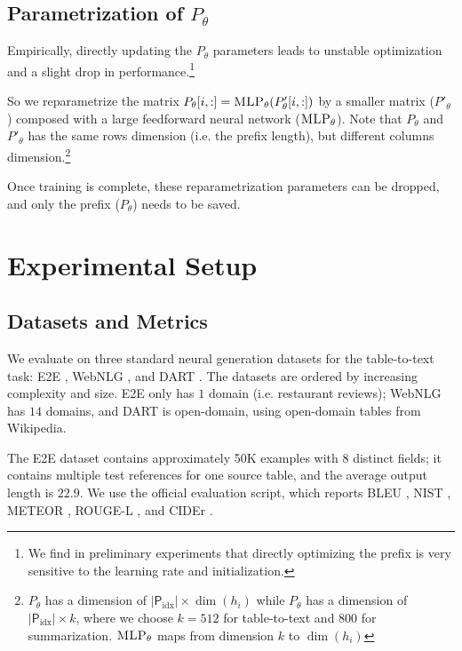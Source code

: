 \subsection{Parametrization of $P_\theta$ }
\label{ssec:parametrization}
Empirically, directly updating the $P_\theta$ parameters leads to unstable optimization and a slight drop in performance.\footnote{We find in preliminary experiments that directly optimizing the prefix is very sensitive to the learning rate and initialization.}

So we reparametrize the matrix $P_\theta [i,:]= \textsc{MLP}_\theta (P'_\theta[i,:])$ by a smaller matrix ($P'_\theta$) composed with a large feedforward neural network ($\textsc{MLP}_\theta$). 
Note that  $P_\theta$ and $P'_\theta$ has the same rows dimension (i.e. the prefix length), but different columns dimension.\footnote{$P_\theta$  has a dimension of $|\textsf{P$_{\text{idx}}$}| \times \dim(h_i)$ while $P_\theta$ has a dimension  of  $|\textsf{P$_{\text{idx}}$}| \times k$, where we choose $k=512$ for table-to-text and $800$ for summarization. $\textsc{MLP}_\theta$ maps from dimension $k$ to $\dim(h_i)$} 

Once training is complete, these reparametrization parameters can be dropped, and only the prefix ($P_\theta$) needs to be saved.  

\section{Experimental Setup}

\subsection{Datasets and Metrics}
\label{ssec:dataset}
We evaluate on three standard neural generation datasets for the table-to-text task: E2E \cite{e2edata}, WebNLG \cite{webnlg-2017}, and DART \cite{radev2020dart}. The datasets are ordered by increasing complexity and size. E2E only has $1$ domain (i.e. restaurant reviews); WebNLG has $14$ domains, and DART is open-domain, using open-domain tables from Wikipedia.

The E2E dataset contains approximately 50K examples with 8 distinct fields; it contains multiple test references for one source table, and the average output length is $22.9$.  We use the official evaluation script, which reports  BLEU \cite{bleu}, NIST \cite{belz-reiter-nist}, METEOR \cite{Lavie-meteor}, ROUGE-L \cite{lin-2004-rouge}, and CIDEr \cite{cider}.

